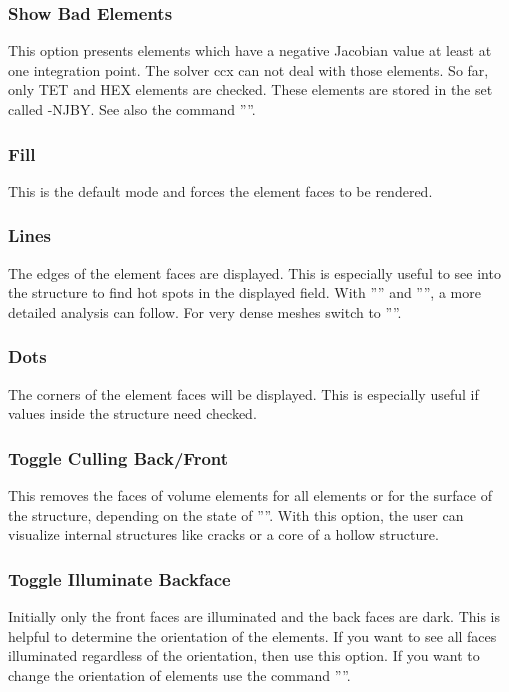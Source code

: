 \documentclass{article}
\begin{document}
\subsubsection{\label{Show Bad Elements}Show Bad Elements}
This option presents elements which have a negative Jacobian value at least at one integration point. The solver ccx can not deal with those elements. So far, only TET and HEX elements are checked. These elements are stored in the set called -NJBY. See also the command ''''.

\subsubsection{\label{Fill}Fill}
This is the default mode and forces the element faces to be rendered.

\subsubsection{\label{Lines}Lines}
The edges of the element faces are displayed. This is especially useful to see into the structure to find hot spots in the displayed field. With '''' and '''', a more detailed analysis can follow. For very dense meshes switch to ''''.

\subsubsection{\label{Dots}Dots}
The corners of the element faces will be displayed. This is especially useful if values inside the structure need checked.

\subsubsection{\label{Toggle Culling Back/Front}Toggle Culling Back/Front}
This removes the faces of volume elements for all elements or for the surface of the structure, depending on the state of ''''. With this option, the user can visualize internal structures like cracks or a core of a hollow structure.

\subsubsection{\label{Toggle Illuminate Backface}Toggle Illuminate Backface}
Initially only the front faces are illuminated and the back faces are dark. This is helpful to determine the orientation of the elements. If you want to see all faces illuminated regardless of the orientation, then use this option. If you want to change the orientation of elements use the command ''''.
\end{document}
